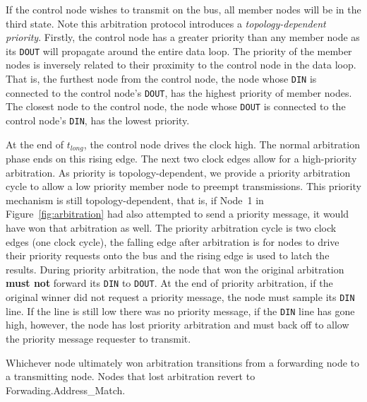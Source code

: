 If the control node wishes to transmit on the bus, all member nodes will be in
the third state. Note this arbitration protocol introduces a {\em
topology-dependent priority}. Firstly, the control node has a greater priority
than any member node as its {\tt DOUT} will propagate around the entire data
loop. The priority of the member nodes is inversely related to their proximity
to the control node in the data loop. That is, the furthest node from the
control node, the node whose {\tt DIN} is connected to the control node's
{\tt DOUT}, has the highest priority of member nodes. The closest node to the
control node, the node whose {\tt DOUT} is connected to the control node's
{\tt DIN}, has the lowest priority.

At the end of $t_{long}$, the control node drives the clock high. The
normal arbitration phase ends on this rising edge. The next two clock edges
allow for a high-priority arbitration. As \bus priority is topology-dependent,
we provide a priority arbitration cycle to allow a low priority member node to
preempt transmissions. This priority mechanism is still topology-dependent,
that is, if Node~1 in Figure~\ref{fig:arbitration} had also attempted to send
a priority message, it would have won that arbitration as well. The priority
arbitration cycle is two clock edges (one clock cycle), the falling edge after
arbitration is for nodes to drive their priority requests onto the bus and the
rising edge is used to latch the results.  During priority arbitration, the
node that won the original arbitration {\bf must not} forward its {\tt DIN} to
{\tt DOUT}. At the end of priority
arbitration, if the original winner did not request a priority message, the
node must sample its {\tt DIN} line. If the line is still low there was no
priority message, if the {\tt DIN} line has gone high, however, the node
has lost priority arbitration and must back off to allow the priority message
requester to transmit.

Whichever node ultimately won arbitration transitions from a forwarding node
to a transmitting node. Nodes that lost arbitration revert to
Forwading.{\sc Address\_Match}.

\begin{figure}
  \figTimingInterrupt
\end{figure}
{}

